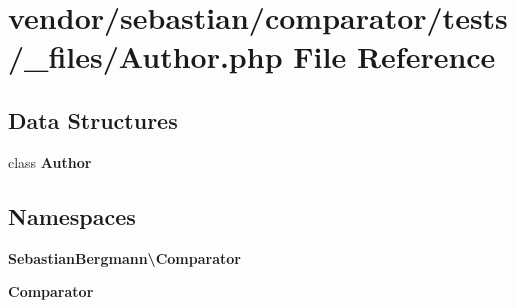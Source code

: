 \section{vendor/sebastian/comparator/tests/\+\_\+files/\+Author.php File Reference}
\label{sebastian_2comparator_2tests_2__files_2_author_8php}
\subsection*{Data Structures}
\begin{DoxyCompactItemize}
\item 
class {\bf Author}
\end{DoxyCompactItemize}
\subsection*{Namespaces}
\begin{DoxyCompactItemize}
\item 
 {\bf Sebastian\+Bergmann\textbackslash{}\+Comparator}
\item 
 {\bf Comparator}
\end{DoxyCompactItemize}
